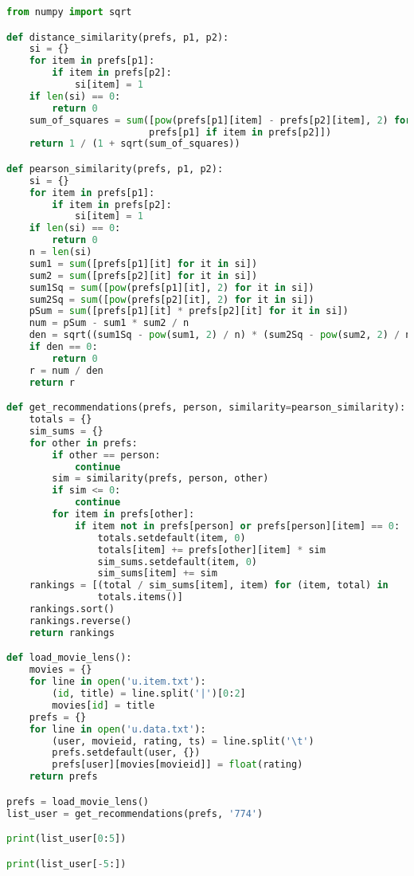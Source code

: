 \documentclass[12pt]{article}
\begin{document}
\begin{lstlisting}[language=Python, caption=Recommendation movies code] 
from numpy import sqrt

def distance_similarity(prefs, p1, p2):
    si = {}
    for item in prefs[p1]:
        if item in prefs[p2]:
            si[item] = 1
    if len(si) == 0:
        return 0
    sum_of_squares = sum([pow(prefs[p1][item] - prefs[p2][item], 2) for item in
                         prefs[p1] if item in prefs[p2]])
    return 1 / (1 + sqrt(sum_of_squares))

def pearson_similarity(prefs, p1, p2):
    si = {}
    for item in prefs[p1]:
        if item in prefs[p2]:
            si[item] = 1
    if len(si) == 0:
        return 0
    n = len(si)
    sum1 = sum([prefs[p1][it] for it in si])
    sum2 = sum([prefs[p2][it] for it in si])
    sum1Sq = sum([pow(prefs[p1][it], 2) for it in si])
    sum2Sq = sum([pow(prefs[p2][it], 2) for it in si])
    pSum = sum([prefs[p1][it] * prefs[p2][it] for it in si])
    num = pSum - sum1 * sum2 / n
    den = sqrt((sum1Sq - pow(sum1, 2) / n) * (sum2Sq - pow(sum2, 2) / n))
    if den == 0:
        return 0
    r = num / den
    return r

def get_recommendations(prefs, person, similarity=pearson_similarity):
    totals = {}
    sim_sums = {}
    for other in prefs:
        if other == person:
            continue
        sim = similarity(prefs, person, other)
        if sim <= 0:
            continue
        for item in prefs[other]:
            if item not in prefs[person] or prefs[person][item] == 0:
                totals.setdefault(item, 0)
                totals[item] += prefs[other][item] * sim
                sim_sums.setdefault(item, 0)
                sim_sums[item] += sim
    rankings = [(total / sim_sums[item], item) for (item, total) in
                totals.items()]
    rankings.sort()
    rankings.reverse()
    return rankings

def load_movie_lens():
    movies = {}
    for line in open('u.item.txt'):
        (id, title) = line.split('|')[0:2]
        movies[id] = title
    prefs = {}
    for line in open('u.data.txt'):
        (user, movieid, rating, ts) = line.split('\t')
        prefs.setdefault(user, {})
        prefs[user][movies[movieid]] = float(rating)
    return prefs

prefs = load_movie_lens()
list_user = get_recommendations(prefs, '774')

print(list_user[0:5])

print(list_user[-5:])

\end{lstlisting}
\end{document}
